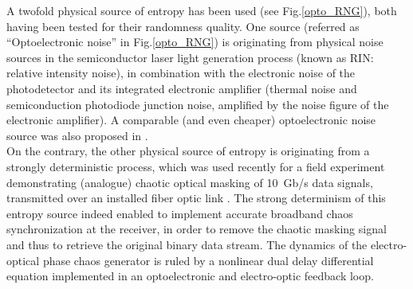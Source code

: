 A twofold physical source of entropy has been used (see Fig.\ref{opto_RNG}), both having been tested for their randomness quality. One source (referred as ``Optoelectronic noise'' in Fig.\ref{opto_RNG}) is originating from physical noise sources in the semiconductor laser light generation process (known as RIN: relative intensity noise), in combination with the electronic noise of the photodetector and its integrated electronic amplifier (thermal noise and semiconduction photodiode junction noise, amplified by the noise figure of the electronic amplifier). A comparable (and even cheaper) optoelectronic noise source was also proposed in \cite{li:OL11}.\\
%
On the contrary, the other physical source of entropy is originating from a strongly deterministic process, which was used recently for a field experiment demonstrating (analogue) chaotic optical masking of 10~Gb/s data signals, transmitted over an installed fiber optic link \cite{lavrov:jqe10}. The strong determinism of this entropy source indeed enabled to implement accurate broadband chaos synchronization at the receiver, in order to remove the chaotic masking signal and thus to retrieve the original binary data stream.  The dynamics of the electro-optical phase chaos generator is ruled by a nonlinear dual delay differential equation implemented in an optoelectronic and electro-optic feedback loop. 

